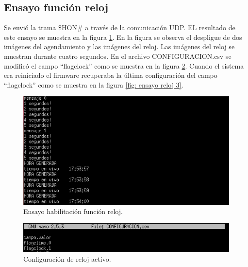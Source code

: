 \subsection{Ensayo función reloj}

Se envió la trama \$HON\# a través de la comunicación UDP. EL resultado de este ensayo se muestra en la figura \ref{fig: ensayo reloj 1}. En la figura se observa el despligue de dos imágenes del agendamiento y las imágenes del reloj. Las imágenes del reloj se muestran durante cuatro segundos. En el archivo CONFIGURACION.csv se modificó el campo ``flagclock'' como se muestra en la figura \ref{fig: ensayo reloj 2}. Cuando el sistema era reiniciado el firmware recuperaba la última configuración del campo ``flagclock'' como se muestra en la figura \ref{fig: ensayo reloj 3}. 

\begin{figure}[htpb]
	\centering
	\includegraphics[scale=0.8]{Figures/pruebareloj1.png} 
	\caption{Ensayo habilitación función reloj.}
	\label{fig: ensayo reloj 1}
\end{figure}

\begin{figure}[htpb]
	\centering
	\includegraphics[scale=0.8]{Figures/pruebareloj2.png} 
	\caption{Configuración de reloj activo.}
	\label{fig: ensayo reloj 2}
\end{figure}

